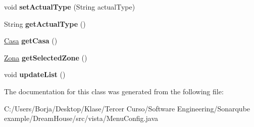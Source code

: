\begin{DoxyCompactItemize}
void {\bfseries set\+Actual\+Type} (String actual\+Type)
\item 
\mbox{\label{classvista_1_1_menu_config_a88aae2ab7436ffc6a08a5d62c4b8cec3}} 
String {\bfseries get\+Actual\+Type} ()
\item 
\mbox{\label{classvista_1_1_menu_config_acebc3b3ad4cbccf1adf2be86993e7be6}} 
\mbox{\hyperlink{classmodelo_1_1_casa}{Casa}} {\bfseries get\+Casa} ()
\item 
\mbox{\label{classvista_1_1_menu_config_ac8e0381bd5316a1bca4eeae90a1570a9}} 
\mbox{\hyperlink{classmodelo_1_1_zona}{Zona}} {\bfseries get\+Selected\+Zone} ()
\item 
\mbox{\label{classvista_1_1_menu_config_af350e1398cbcb22c4c621cc7216bc37e}} 
void {\bfseries update\+List} ()
\end{DoxyCompactItemize}


The documentation for this class was generated from the following file\+:\begin{DoxyCompactItemize}
\item 
C\+:/\+Users/\+Borja/\+Desktop/\+Klase/\+Tercer Curso/\+Software Engineering/\+Sonarqube example/\+Dream\+House/src/vista/Menu\+Config.\+java\end{DoxyCompactItemize}
